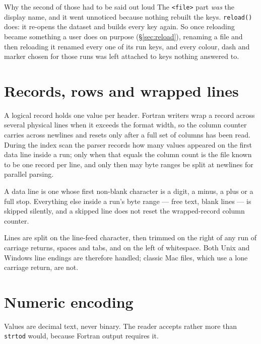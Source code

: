 \documentclass[11pt,a4paper,oneside]{report}
\newcommand{\code}[1]{\texttt{#1}}
\begin{document}
\begin{aoenote}{Why the second of those had to be said out loud}
The \code{<file>} part \emph{was} the display name, and it went unnoticed
because nothing rebuilt the keys. \code{reload()} does: it re-opens the dataset
and builds every key again. So once reloading became something a user does on
purpose (\S\ref{sec:reload}), renaming a file and then reloading it renamed
every one of its run keys, and every colour, dash and marker chosen for those
runs was left attached to keys nothing answered to.
\end{aoenote}

\section{Records, rows and wrapped lines}

A logical record holds one value per header. Fortran writers wrap a record across
several physical lines when it exceeds the format width, so the column counter
carries across newlines and resets only after a full set of columns has been
read. During the index scan the parser records how many values appeared on the
first data line inside a run; only when that equals the column count is the file
known to be one record per line, and only then may byte ranges be split at
newlines for parallel parsing.

A data line is one whose first non-blank character is a digit, a minus, a plus or
a full stop. Everything else inside a run's byte range --- free text, blank lines
--- is skipped silently, and a skipped line does not reset the wrapped-record
column counter.

Lines are split on the line-feed character, then trimmed on the right of any run
of carriage returns, spaces and tabs, and on the left of whitespace. Both Unix
and Windows line endings are therefore handled; classic Mac files, which use a
lone carriage return, are not.

\section{Numeric encoding}

Values are decimal text, never binary. The reader accepts rather more than
\code{strtod} would, because Fortran output requires it.
\end{document}
